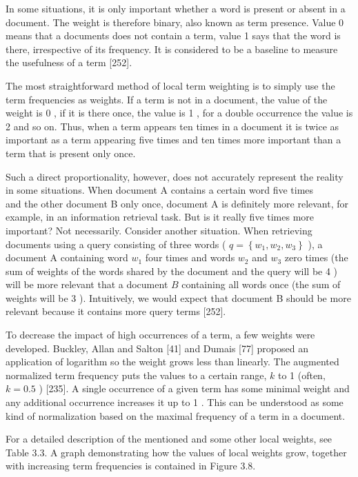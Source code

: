 \documentclass[10pt]{book}
\begin{document}
In some situations, it is only important whether a word is present or absent in a document. The weight is therefore binary, also known as term presence. Value 0 means that a documents does not contain a term, value 1 says that the word is there, irrespective of its frequency. It is considered to be a baseline to measure the usefulness of a term [252].

The most straightforward method of local term weighting is to simply use the term frequencies as weights. If a term is not in a document, the value of the weight is 0 , if it is there once, the value is 1 , for a double occurrence the value is 2 and so on. Thus, when a term appears ten times in a document it is twice as important as a term appearing five times and ten times more important than a term that is present only once.

Such a direct proportionality, however, does not accurately represent the reality in some situations. When document A contains a certain word five times\\
and the other document B only once, document A is definitely more relevant, for example, in an information retrieval task. But is it really five times more important? Not necessarily. Consider another situation. When retrieving documents using a query consisting of three words ( $q=\left\{w_{1}, w_{2}, w_{3}\right\}$ ), a document A containing word $w_{1}$ four times and words $w_{2}$ and $w_{3}$ zero times (the sum of weights of the words shared by the document and the query will be 4 ) will be more relevant that a document $B$ containing all words once (the sum of weights will be 3 ). Intuitively, we would expect that document B should be more relevant because it contains more query terms [252].

To decrease the impact of high occurrences of a term, a few weights were developed. Buckley, Allan and Salton [41] and Dumais [77] proposed an application of logarithm so the weight grows less than linearly. The augmented normalized term frequency puts the values to a certain range, $k$ to 1 (often, $k=0.5$ ) [235]. A single occurrence of a given term has some minimal weight and any additional occurrence increases it up to 1 . This can be understood as some kind of normalization based on the maximal frequency of a term in a document.

For a detailed description of the mentioned and some other local weights, see Table 3.3. A graph demonstrating how the values of local weights grow, together with increasing term frequencies is contained in Figure 3.8.
\end{document}
